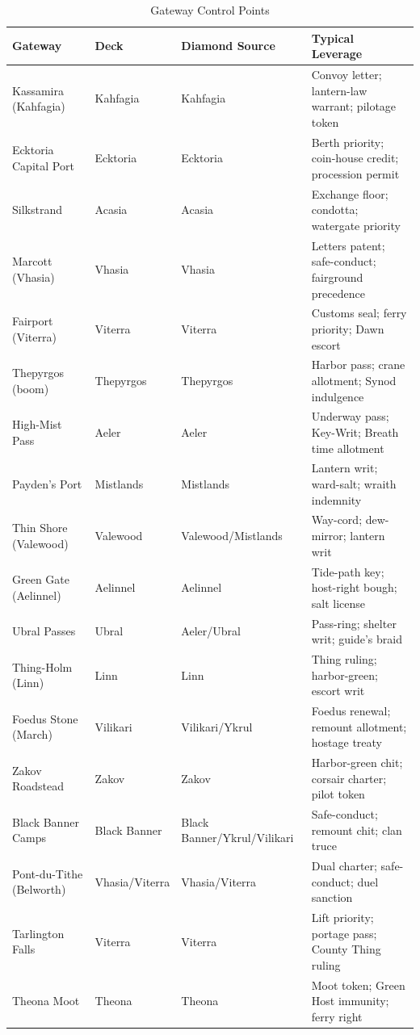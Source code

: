 \documentclass[11pt,letterpaper,twoside]{book}
\begin{document}
\begin{table}[h]
\centering
\begin{tabular}{|l|l|l|l|}
\hline
\textbf{Gateway} & \textbf{Deck} & \textbf{Diamond Source} & \textbf{Typical Leverage} \\
\hline
Kassamira (Kahfagia) & Kahfagia & Kahfagia & Convoy letter; lantern-law warrant; pilotage token \\
Ecktoria Capital Port & Ecktoria & Ecktoria & Berth priority; coin-house credit; procession permit \\
Silkstrand & Acasia & Acasia & Exchange floor; condotta; watergate priority \\
Marcott (Vhasia) & Vhasia & Vhasia & Letters patent; safe-conduct; fairground precedence \\
Fairport (Viterra) & Viterra & Viterra & Customs seal; ferry priority; Dawn escort \\
Thepyrgos (boom) & Thepyrgos & Thepyrgos & Harbor pass; crane allotment; Synod indulgence \\
High-Mist Pass & Aeler & Aeler & Underway pass; Key-Writ; Breath time allotment \\
Payden's Port & Mistlands & Mistlands & Lantern writ; ward-salt; wraith indemnity \\
Thin Shore (Valewood) & Valewood & Valewood/Mistlands & Way-cord; dew-mirror; lantern writ \\
Green Gate (Aelinnel) & Aelinnel & Aelinnel & Tide-path key; host-right bough; salt license \\
Ubral Passes & Ubral & Aeler/Ubral & Pass-ring; shelter writ; guide's braid \\
Thing-Holm (Linn) & Linn & Linn & Thing ruling; harbor-green; escort writ \\
Foedus Stone (March) & Vilikari & Vilikari/Ykrul & Foedus renewal; remount allotment; hostage treaty \\
Zakov Roadstead & Zakov & Zakov & Harbor-green chit; corsair charter; pilot token \\
Black Banner Camps & Black Banner & Black Banner/Ykrul/Vilikari & Safe-conduct; remount chit; clan truce \\
Pont-du-Tithe (Belworth) & Vhasia/Viterra & Vhasia/Viterra & Dual charter; safe-conduct; duel sanction \\
Tarlington Falls & Viterra & Viterra & Lift priority; portage pass; County Thing ruling \\
Theona Moot & Theona & Theona & Moot token; Green Host immunity; ferry right \\
\hline
\end{tabular}
\caption{Gateway Control Points}
\label{tab:gateways}
\end{table}
\end{document}
